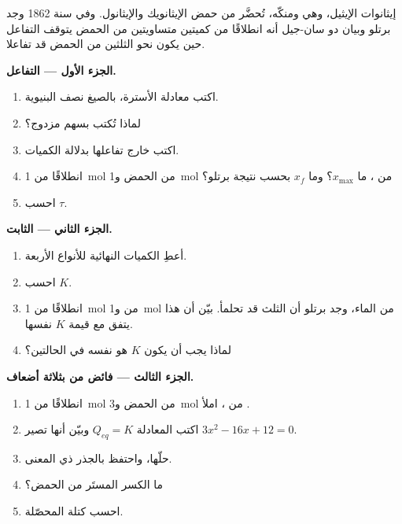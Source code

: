 \begin{problem}
\label{pb:g12:equilibrium:1}
إيثانوات الإيثيل، وهي  ومنكّه، تُحضَّر من حمض الإيثانويك
والإيثانول. وفي سنة 1862 وجد برتلو وبيان دو سان-جيل أنه انطلاقًا من
كميتين متساويتين من الحمض  يتوقف التفاعل حين يكون نحو الثلثين
من الحمض قد تفاعلا.

\medskip
\noindent\textbf{الجزء الأول --- التفاعل.}
\begin{enumerate}
  \item اكتب معادلة الأسترة، بالصيغ نصف
        البنيوية.
  \item لماذا تُكتب بسهم مزدوج؟
  \item اكتب خارج تفاعلها بدلالة الكميات.
  \item انطلاقًا من \qty{1}{mol} من الحمض و\qty{1}{mol} من ، ما
        $x_{\max}$؟ وما $x_f$ بحسب نتيجة برتلو؟
  \item احسب $\tau$.
\end{enumerate}

\medskip
\noindent\textbf{الجزء الثاني --- الثابت.}
\begin{enumerate}[resume]
  \item أعطِ الكميات النهائية للأنواع الأربعة.
  \item احسب $K$.
  \item انطلاقًا من \qty{1}{mol} من  و\qty{1}{mol} من الماء،
        وجد برتلو أن الثلث قد تحلمأ. بيّن أن هذا يتفق مع
        قيمة $K$ نفسها.
  \item لماذا يجب أن يكون $K$ هو نفسه في الحالتين؟
\end{enumerate}

\medskip
\noindent\textbf{الجزء الثالث --- فائض من  بثلاثة أضعاف.}
\begin{enumerate}[resume]
  \item انطلاقًا من \qty{1}{mol} من الحمض و\qty{3}{mol} من ، املأ
        .
  \item اكتب المعادلة $Q_{eq} = K$ وبيّن أنها تصير
        $3x^2 - 16x + 12 = 0$.
  \item حلّها، واحتفظ بالجذر ذي المعنى.
  \item ما الكسر المستَر من الحمض؟
  \item احسب كتلة  المحصّلة.
\end{enumerate}


\end{problem}
